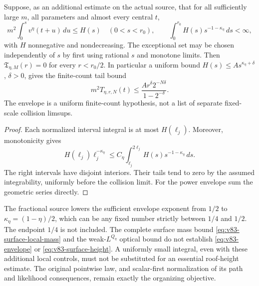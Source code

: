 \begin{proposition}
\label{prop:v83-envelope}
Suppose, as an additional estimate on the actual source, that for
all sufficiently large $m$, all parameters and almost every central
$t$,
\begin{equation}\label{eq:v83-envelope}
 m^2\int_0^s v^\eta(t+u)\,du\le H(s)\quad(0<s<r_0),\qquad
 \int_0^{r_0}H(s)s^{-1-\kappa_\eta}\,ds<\infty,
\end{equation}
with $H$ nonnegative and nondecreasing. The exceptional set may be
chosen independently of $s$ by first using rational $s$ and monotone
limits. Then $\mathfrak T_{\eta,M}(r)=0$ for every $r<r_0/2$.
In particular a uniform bound $H(s)\le A s^{\kappa_\eta+\delta}$,
$\delta>0$, gives the finite-count tail bound
\begin{equation}\label{eq:v83-envelope-tail}
 m^2 T_{\eta,r,N}(t)
        \le \frac{A r^\delta2^{-N\delta}}{1-2^{-\delta}}.
\end{equation}
The envelope is a uniform finite-count hypothesis, not a list of
separate fixed-scale collision limsups.
\end{proposition}
\begin{proof}
Each normalized interval integral is at most $H(\ell_j)$.
Moreover, monotonicity gives
\[
 H(\ell_j)\ell_j^{-\kappa_\eta}
 \le C_\eta\int_{\ell_j}^{2\ell_j}H(s)s^{-1-\kappa_\eta}\,ds.
\]
The right intervals have disjoint interiors. Their tails tend to
zero by the assumed integrability, uniformly before the collision
limit. For the power envelope sum the geometric series directly.
\end{proof}

The fractional source lowers the sufficient envelope exponent from
$1/2$ to $\kappa_\eta=(1-\eta)/2$, which can be any fixed number
strictly between $1/4$ and $1/2$. The endpoint $1/4$ is not included.
The complete surface mass bound \eqref{eq:v83-surface-local-mass}
and the weak-$L^{Q_\eta}$ optical bound do not establish
\eqref{eq:v83-envelope} or \eqref{eq:v83-surface-height}. A uniformly
small integral, even with these additional local controls, must not
be substituted for an essential roof-height estimate. The original
pointwise law, and scalar-first normalization of its path and
likelihood consequences, remain exactly the organizing objective.
